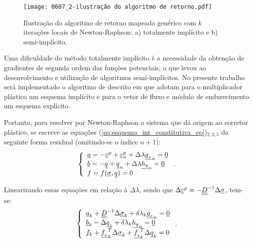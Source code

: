 \begin{figure}[H]
	\begin{center}
		\texttt{[image: 0607\_2-ilustração do algoritmo de retorno.pdf]}
	\end{center}
	\caption{\label{algoritmo_retorno}Ilustração do algoritmo de retorno mapeado genérico com $k$ iterações locais de Newton-Raphson: a) totalmente implícito e b) semi-implícito.}
\end{figure}

Uma dificuldade do método totalmente implícito é a necessidade da obtenção de gradientes de segunda ordem das funções potenciais, o que levou ao desenvolvimento e utilização de algoritmos semi-implícitos. No presente trabalho será implementado o algoritmo de  descrito em  que adotam para o multiplicador plástico um esquema implícito e para o vetor de fluxo e módulo de endurecimento um esquema explícito.

Portanto, para resolver por Newton-Raphson o sistema que dá origem ao corretor plástico, se escreve as equações (\ref{eq:esquema_int_constitutiva_ep})$_{2,3,5}$ da seguinte forma residual (omitindo-se o índice $n+1$):
\begin{equation}
	\label{eq:algoritmo_ep_1}
	\left\{
	\begin{array}{lcl}
		\underline{a} = -\underline{\varepsilon}^p + \underline{\varepsilon}_n^p + \Delta \lambda \underline{g_{_\sigma}}_n = \underline{0}	\\
		\underline{b} = -\underline q + \underline q_n + \Delta\lambda\underline{h_q}_n = \underline{0} \\
		f = f(\underline \sigma,\underline q) = 0
	\end{array}
	\right..
\end{equation}

Linearizando essas equações em relação à $\Delta \lambda$, sendo que $\Delta \underline{\varepsilon}^p = - \underline{\underline D}^{-1}\Delta\underline \sigma$, tem-se:
\begin{equation}
	\label{eq:algoritmo_ep_2}
	\left\{
	\begin{array}{lcl}
		\underline{a}_k + \underline{\underline D}^{-1}\Delta\underline \sigma_k + \delta \lambda_k \underline{g_{_\sigma}}_n = \underline{0} \\
		\underline{b}_k - \Delta \underline q_k + \delta \lambda_k \underline{h_q}_n = \underline{0} \\
		f_k + \underline{f_{_\sigma}}_k^T\Delta\underline \sigma_k + \underline{f_{_q}}_k^T \Delta \underline q_k = 0
	\end{array}
	\right..
\end{equation}

